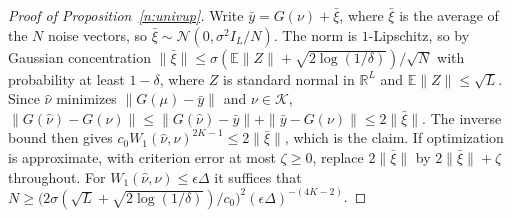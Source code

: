 \documentclass[12pt]{article}
\theoremstyle{definition}
\theoremstyle{remark}
\begin{document}
\begin{proof}[Proof of Proposition~\ref{n:univup}]
Write $\bar y=G(\nu)+\bar\xi$, where $\bar\xi$ is the average of the $N$ noise vectors, so $\bar\xi\sim\mathcal N(0,\sigma^2I_L/N)$. The norm is $1$-Lipschitz, so by Gaussian concentration $\|\bar\xi\|\le\sigma(\mathbb E\|Z\|+\sqrt{2\log(1/\delta)})/\sqrt N$ with probability at least $1-\delta$, where $Z$ is standard normal in $\mathbb R^L$ and $\mathbb E\|Z\|\le\sqrt L$. Since $\hat\nu$ minimizes $\|G(\mu)-\bar y\|$ and $\nu\in\mathcal K$, $\|G(\hat\nu)-G(\nu)\|\le\|G(\hat\nu)-\bar y\|+\|\bar y-G(\nu)\|\le2\|\bar\xi\|$. The inverse bound then gives $c_0W_1(\hat\nu,\nu)^{2K-1}\le2\|\bar\xi\|$, which is the claim. If optimization is approximate, with criterion error at most $\zeta\ge0$, replace $2\|\bar\xi\|$ by $2\|\bar\xi\|+\zeta$ throughout. For $W_1(\hat\nu,\nu)\le\epsilon\Delta$ it suffices that $N\ge\big(2\sigma(\sqrt L+\sqrt{2\log(1/\delta)})/c_0\big)^2(\epsilon\Delta)^{-(4K-2)}$.
\end{proof}
\end{document}
